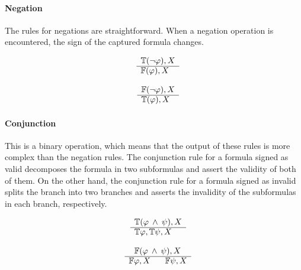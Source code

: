 \documentclass{article}
\begin{document}
		\paragraph{Negation}
The rules for negations are straightforward. When a negation operation is encountered, the sign of the captured formula changes.
		\newline
		\noindent\begin{minipage}{.5\linewidth}
		\begin{align*}
			\begin{array}{rl}
				& \mathbb{T}(\neg \varphi), X \\
				      \cline{2-2}
				      & \mathbb{F}(\varphi), X
			\end{array}
		\end{align*}
		\end{minipage}%
		\begin{minipage}{.5\linewidth}
		\begin{align*}
			\begin{array}{rl}
				& \mathbb{F}(\neg \varphi), X \\
			      \cline{2-2}
			      & \mathbb{T}(\varphi), X
			\end{array}
		\end{align*}
		\end{minipage}
		
		\paragraph{Conjunction}
This is a binary operation, which means that the output of these rules is more complex than the negation rules.
The conjunction rule for a formula signed as valid decomposes the formula in two subformulas and assert the validity of both of them.
On the other hand, the conjunction rule for a formula signed as invalid splits the branch into two branches and asserts the invalidity of the subformulas in each branch, respectively.
		\newline
		\noindent\begin{minipage}{.5\linewidth}
		\begin{align*}
			\begin{array}{rl}
				& \mathbb{T}(\varphi \: \wedge \: \psi), X \\
			      \cline{2-2}
			      & \mathbb{T}\varphi, \mathbb{T}\psi, X
			\end{array}
		\end{align*}
		\end{minipage}%
		\begin{minipage}{.5\linewidth}
		\begin{align*}
			\begin{array}{rl}
				& \:\:\: \mathbb{F}(\varphi \: \wedge \: \psi), X \\
			      \cline{2-2}
			      & \mathbb{F}\varphi, X \:\:\:\:\:\:\:\: \mathbb{F}\psi, X
			\end{array}
		\end{align*}
		\end{minipage}
\end{document}
